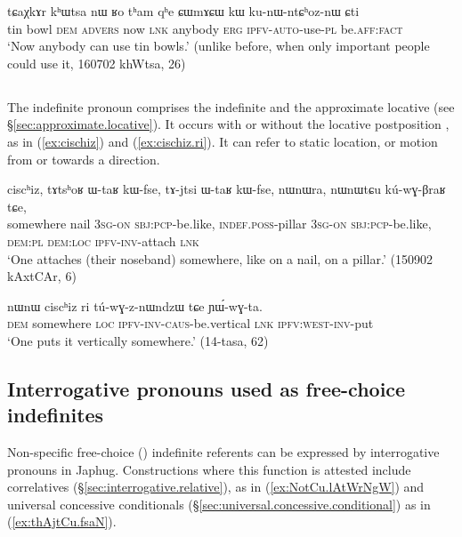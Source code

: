  \begin{exe}
\ex \label{ex:CWmACW.kW}
\gll tɕaχkɤr kʰɯtsa nɯ ʁo tʰam qʰe ɕɯmɤɕɯ kɯ ku-nɯ-ntɕʰoz-nɯ ɕti \\
tin bowl \textsc{dem} \textsc{advers} now \textsc{lnk} anybody \textsc{erg} \textsc{ipfv}-\textsc{auto}-use-\textsc{pl} be.\textsc{aff}:\textsc{fact} \\
\glt `Now anybody can use tin bowls.' (unlike before, when only important people could use it, 160702 khWtsa, 26)
 \end{exe}
 
  \subsection{} \label{sec:cischiz}
The indefinite pronoun  comprises the indefinite  and the approximate locative  (see §\ref{sec:approximate.locative}). It occurs with or without the locative postposition , as in (\ref{ex:cischiz}) and (\ref{ex:cischiz.ri}). It can refer to static location, or motion from or towards a direction.

 \begin{exe}
\ex \label{ex:cischiz}
\gll
ciscʰiz, tɤtsʰoʁ ɯ-taʁ kɯ-fse, tɤ-jtsi ɯ-taʁ kɯ-fse, nɯnɯra, nɯnɯtɕu kú-wɣ-βraʁ tɕe, \\
somewhere nail \textsc{3sg}-\textsc{on} \textsc{sbj}:\textsc{pcp}-be.like, \textsc{indef}.\textsc{poss}-pillar \textsc{3sg}-\textsc{on} \textsc{sbj}:\textsc{pcp}-be.like,  \textsc{dem}:\textsc{pl} \textsc{dem}:\textsc{loc} \textsc{ipfv}-\textsc{inv}-attach \textsc{lnk} \\
\glt `One attaches (their noseband) somewhere, like on a nail, on a pillar.' (150902 kAxtCAr, 6)
 \end{exe}
 
 \begin{exe}
\ex \label{ex:cischiz.ri}
\gll nɯnɯ ciscʰiz ri tú-wɣ-z-nɯndzɯ tɕe ɲɯ́-wɣ-ta.\\
\textsc{dem} somewhere  \textsc{loc} \textsc{ipfv}-\textsc{inv}-\textsc{caus}-be.vertical \textsc{lnk} \textsc{ipfv}:\textsc{west}-\textsc{inv}-put\\
\glt `One puts it vertically somewhere.' (14-tasa, 62)
 \end{exe}
  
 
\subsection{Interrogative pronouns used as free-choice indefinites} \label{sec:interrogative.indef}
Non-specific free-choice (\citealt[48]{haspelmath97indef}) indefinite referents can be expressed by interrogative pronouns in Japhug. Constructions where this function is attested include correlatives (§\ref{sec:interrogative.relative}), as in (\ref{ex:NotCu.lAtWrNgW}) and universal concessive conditionals (§\ref{sec:universal.concessive.conditional}) as in (\ref{ex:thAjtCu.fsaN}).
 
